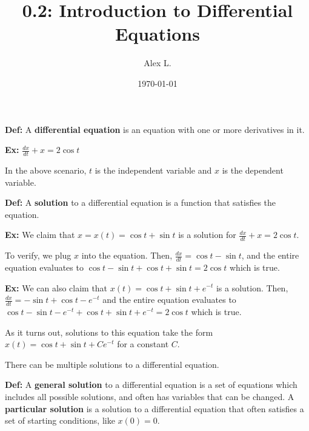 \documentclass{article}
\title{0.2: Introduction to Differential Equations}
\author{Alex L.}
\date{\today}
\begin{document}
\maketitle

\textbf{Def:} A \textbf{differential equation} is an equation with one or more derivatives in it. 

\textbf{Ex:} $\frac{dx}{dt} + x = 2\cos t$

In the above scenario, $t$ is the independent variable and $x$ is the dependent variable.

\textbf{Def:} A \textbf{solution} to a differential equation is a function that satisfies the equation. 

\textbf{Ex:} We claim that $x = x(t) = \cos t + \sin t$ is a solution for $\frac{dx}{dt} + x = 2 \cos t$. 

To verify, we plug $x$ into the equation. Then, $\frac{dx}{dt} = \cos t - \sin t$, and the entire equation evaluates to $\cos t - \sin t + \cos t + \sin t = 2 \cos t$ which is true. 

\textbf{Ex:} We can also claim that $x(t) = \cos t + \sin t + e^{-t}$ is a solution. Then, $\frac{dx}{dt} = -\sin t + \cos t - e^{-t}$ and the entire equation evaluates to $\cos t -\sin t -e^{-t} + \cos t + \sin t + e^{-t} = 2\cos t$ which is true. 

As it turns out, solutions to this equation take the form $x(t) = \cos t + \sin t + Ce^{-t}$ for a constant $C$. 

There can be multiple solutions to a differential equation. 

\textbf{Def:} A \textbf{general solution} to a differential equation is a set of equations which includes all possible solutions, and often has variables that can be changed. A \textbf{particular solution} is a solution to a differential equation that often satisfies a set of starting conditions, like $x(0) = 0$.
\end{document}
